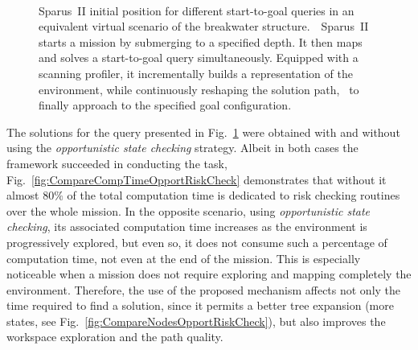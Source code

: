 \begin{figure}[htbp]
\myfloatalign
     \quad
     \\
     \quad
\caption[Sparus~II solving a start-to-goal query in an equivalent virtual
scenario of the breakwater structure without an initial map.]
{\protect{} Sparus~II initial position for
different start-to-goal queries in an equivalent virtual scenario of the
breakwater structure.~\protect{}~Sparus~II
starts a mission by submerging to a specified depth. It then maps and solves a
start-to-goal query simultaneously.
\protect{} Equipped with a scanning
profiler, it incrementally builds a representation of the environment, while
continuously reshaping the solution
path,~\protect{} to finally approach to the
specified goal configuration.}
\label{fig:MappingPlanningOpportRisk}
\end{figure}

The solutions for the query presented in
Fig.~\ref{fig:MappingPlanningOpportRisk} were obtained with and without using
the \textit{opportunistic state checking} strategy. Albeit in both cases the
framework succeeded in conducting the task,
Fig.~\ref{fig:CompareCompTimeOpportRiskCheck} demonstrates that without it
almost $80\%$ of the total computation time is dedicated to risk checking
routines over the whole mission. In the opposite scenario, \ie using
\textit{opportunistic state checking}, its associated computation time increases
as the environment is progressively explored, but even so, it does not consume
such a percentage of computation time, not even at the end of the mission. This
is especially noticeable when a mission does not require exploring and mapping
completely the environment. Therefore, the use of the proposed mechanism affects
not only the time required to find a solution, since it permits a better tree
expansion (\ie more states, see Fig.~\ref{fig:CompareNodesOpportRiskCheck}), but
also improves the workspace exploration and the path quality.

